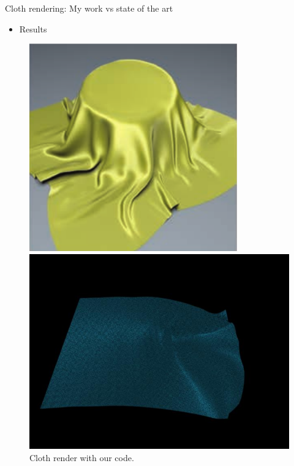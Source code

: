 \documentclass{beamer}
\begin{document}
\begin{frame}{Cloth rendering: My work vs state of the art}
\begin{itemize}
\setlength\itemsep{0.5em}
\item Results
\end{itemize}
\begin{figure}[!htb]
    \centering
    \begin{minipage}{.5\textwidth}
        \centering
        \includegraphics[width=0.8\textwidth]{img/cloth_paper}
        \caption*{Cloth render result from [SBD*13].}
    \end{minipage}%
	\centering
    \begin{minipage}{.5\textwidth}
        \centering
        \includegraphics[width=\textwidth]{img/cloth_render}
        \caption*{Cloth render with our code.}
    \end{minipage}%
\end{figure}
\end{frame}
\end{document}
